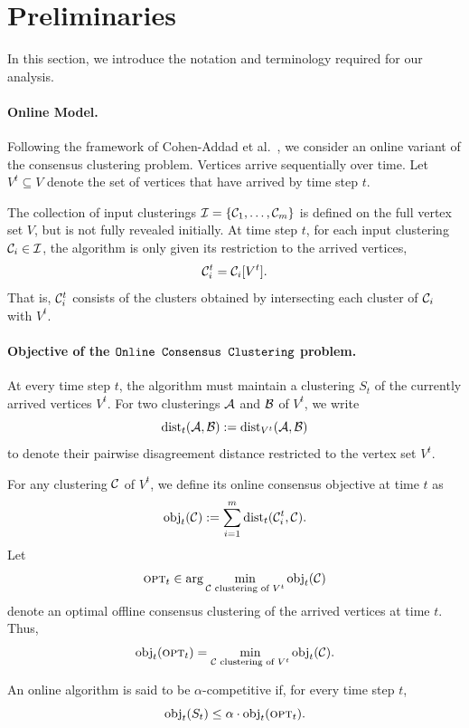 \section{Preliminaries}

In this section, we introduce the notation and terminology required for our analysis.

\paragraph{Online Model.}
Following the framework of Cohen-Addad et al.~\cite{cohen2022online}, we consider an online variant of the consensus clustering problem.
Vertices arrive sequentially over time.
Let $V^t \subseteq V$ denote the set of vertices that have arrived by time step $t$.

The collection of input clusterings $\mathcal{I} = \{\mathcal{C}_1, \ldots, \mathcal{C}_m\}$ is defined on the full vertex set $V$, but is not fully revealed initially.
At time step $t$, for each input clustering $\mathcal{C}_i \in \mathcal{I}$, the algorithm is only given its restriction to the arrived vertices,
\[
    \mathcal{C}_i^t = \mathcal{C}_i[V^t].
\]
That is, $\mathcal{C}_i^t$ consists of the clusters obtained by intersecting each cluster of $\mathcal{C}_i$ with $V^t$.

\paragraph{Objective of the \(\texttt{Online Consensus Clustering}\) problem.}
At every time step \(t\), the algorithm must maintain a clustering \(S_t\) of the currently arrived vertices \(V^t\). For two clusterings \(\mathcal{A}\) and \(\mathcal{B}\) of \(V^t\), we write
\[
    \text{dist}_t(\mathcal{A},\mathcal{B})
    :=
    \text{dist}_{V^t}(\mathcal{A},\mathcal{B})
\]
to denote their pairwise disagreement distance restricted to the vertex set \(V^t\).

For any clustering \(\mathcal{C}\) of \(V^t\), we define its online consensus objective at time \(t\) as
\[
    \text{obj}_t(\mathcal{C})
    :=
    \sum_{i=1}^m
    \text{dist}_t(\mathcal{C}_i^t,\mathcal{C}).
\]
Let
\[
    \textsc{opt}_t
    \in
    \arg\min_{\mathcal{C}\text{ clustering of }V^t}
    \text{obj}_t(\mathcal{C})
\]
denote an optimal offline consensus clustering of the arrived vertices at time \(t\). Thus,
\[
    \text{obj}_t(\textsc{opt}_t)
    =
    \min_{\mathcal{C}\text{ clustering of }V^t}
    \text{obj}_t(\mathcal{C}).
\]

An online algorithm is said to be \(\alpha\)-competitive if, for every time step \(t\),
\[
    \text{obj}_t(S_t)
    \le
    \alpha \cdot \text{obj}_t(\textsc{opt}_t).
\]